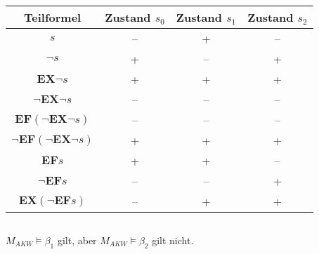 \documentclass[10pt,a4paper,oneside,ngerman,numbers=noenddot]{scrartcl}
\begin{document}
	\subsection{}
	\begin{tabular}{c|c|c|c}
		Teilformel & Zustand \(s_{0}\) & Zustand \(s_{1}\) & Zustand \(s_{2}\) \\
		\hline
		\hline
		\(s\) & -- & + & -- \\
		\(\lnot s\) & + & -- & + \\
		\(\textbf{EX}\lnot s\) & + & + & + \\
		\(\lnot \textbf{EX}\lnot s\) & -- & -- & -- \\
		\(\textbf{EF}(\lnot \textbf{EX}\lnot s) \) & -- & -- & -- \\
		\(\lnot \textbf{EF}(\lnot \textbf{EX}\lnot s) \) & + & + & + \\
		\(\textbf{EF}s\) & + & + & -- \\
		\(\lnot \textbf{EF}s\) & -- & -- & + \\
		\(\textbf{EX}(\lnot \textbf{EF}s) \) & -- & + & +		
	\end{tabular}
	
	\subsection{}
	\(M_{AKW} \models \beta _{1}\) gilt, aber \(M_{AKW} \models \beta _{2}\) gilt nicht.
\end{document}
